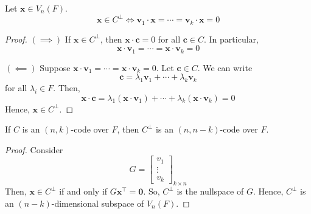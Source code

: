 \begin{thmbox}
    \begin{theorem}
        Let $ \bm{x}\in V_n(F) $.
        \[ \bm{x}\in C^{\perp}\iff \bm{v}_1\cdot \bm{x}=\cdots =\bm{v}_k\cdot \bm{x}=0 \]
    \end{theorem} \end{thmbox}

\begin{proof}
    $ (\implies) $ If $ \bm{x}\in C^{\perp} $, then $ \bm{x}\cdot \bm{c}=0 $ for all
    $ \bm{c}\in C $. In particular,
    \[ \bm{x}\cdot \bm{v}_1=\cdots =\bm{x}\cdot \bm{v}_k=0 \]

    $ (\impliedby) $ Suppose $ \bm{x}\cdot \bm{v}_1=\cdots =\bm{x}\cdot \bm{v}_k=0 $. Let $ \bm{c}\in C $.
    We can write
    \[ \bm{c}=\lambda_1\bm{v}_1+\cdots+\lambda_k\bm{v}_k \]
    for all $ \lambda_i\in F $. Then,
    \[ \bm{x}\cdot \bm{c}=\lambda_1(\bm{x}\cdot \bm{v}_1)+\cdots+\lambda_k(\bm{x}\cdot \bm{v}_k)=0 \]
    Hence, $ \bm{x}\in C^{\perp} $.
\end{proof}

\begin{thmbox}
    \begin{theorem}
        If $ C $ is an $ (n,k) $-code over $ F $, then $ C^{\perp} $ is an
        $ (n,n-k) $-code over $ F $.
    \end{theorem} \end{thmbox}

\begin{proof}
    Consider
    \[ G=\begin{bmatrix}
            v_1    \\
            \vdots \\
            v_k
        \end{bmatrix}_{k\times n} \]
    Then, $ \bm{x}\in C^{\perp} $ if and only if $ G \bm{x}^{\top}=\bm{0} $. So, $ C^{\perp} $
    is the nullspace of $ G $. Hence, $ C^{\perp} $ is an
    $ (n-k) $-dimensional subspace of $ V_n(F) $.
\end{proof}
